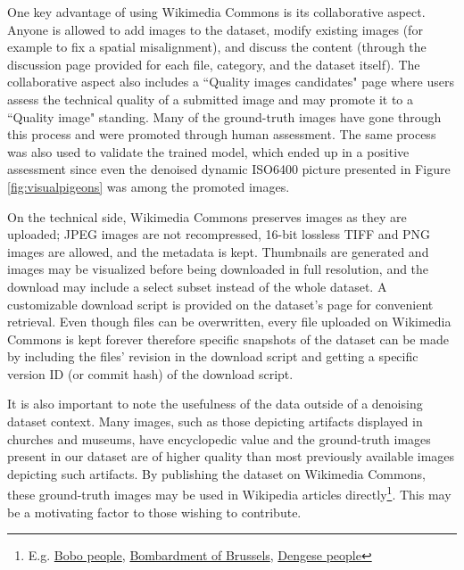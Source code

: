 One key advantage of using Wikimedia Commons is its collaborative aspect. Anyone is allowed to add images to the dataset, modify existing images (for example to fix a spatial misalignment), and discuss the content (through the discussion page provided for each file, category, and the dataset itself). The collaborative aspect also includes a ``Quality images candidates" page \cite{qic} where users assess the technical quality of a submitted image and may promote it to a ``Quality image" standing. Many of the ground-truth images have gone through this process and were promoted through human assessment. The same process was also used to validate the trained model, which ended up in a positive assessment since even the denoised dynamic ISO6400 picture presented in Figure \ref{fig:visualpigeons} was among the promoted images.

On the technical side, Wikimedia Commons preserves images as they are uploaded; JPEG images are not recompressed, 16-bit lossless TIFF and PNG images are allowed, and the metadata is kept. Thumbnails are generated and images may be visualized before being downloaded in full resolution, and the download may include a select subset instead of the whole dataset. A customizable download script is provided on the dataset's page for convenient retrieval. Even though files can be overwritten, every file uploaded on Wikimedia Commons is kept forever therefore specific snapshots of the dataset can be made by including the files' revision in the download script and getting a specific version ID (or commit hash) of the download script.

It is also important to note the usefulness of the data outside of a denoising dataset context. Many images, such as those depicting artifacts displayed in churches and museums, have encyclopedic value and the ground-truth images present in our dataset are of higher quality than most previously available images depicting such artifacts. By publishing the dataset on Wikimedia Commons, these ground-truth images may be used in Wikipedia articles directly\footnote{E.g. \href{https://en.wikipedia.org/wiki/Bobo_people}{Bobo people}, \href{https://en.wikipedia.org/wiki/Bombardment_of_Brussels}{Bombardment of Brussels}, \href{https://en.wikipedia.org/wiki/Dengese_people}{Dengese people}}. This may be a motivating factor to those wishing to contribute.
